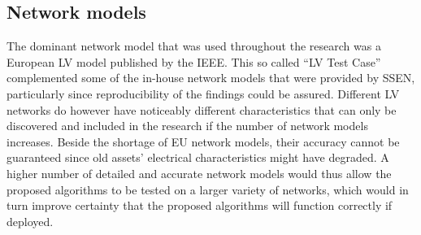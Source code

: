 \subsection{Network models}

The dominant network model that was used throughout the research was a European LV model published by the IEEE.
This so called ``LV Test Case'' complemented some of the in-house network models that were provided by SSEN, particularly since reproducibility of the findings could be assured.
Different LV networks do however have noticeably different characteristics that can only be discovered and included in the research if the number of network models increases.
Beside the shortage of EU network models, their accuracy cannot be guaranteed since old assets' electrical characteristics might have degraded.
A higher number of detailed and accurate network models would thus allow the proposed algorithms to be tested on a larger variety of networks, which would in turn improve certainty that the proposed algorithms will function correctly if deployed.
